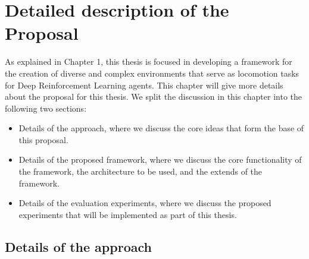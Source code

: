 
\chapter{Detailed description of the Proposal}
\label{ch:proposal}



As explained in Chapter 1, this thesis is focused  in developing a framework for 
the creation of diverse and complex environments that serve as locomotion tasks 
for Deep Reinforcement Learning agents. This chapter will give more details about the 
proposal for this thesis. We split the discussion in this chapter into the following two sections: 

\begin{itemize}
    \item Details of the approach, where we discuss the core ideas that form the base 
          of this proposal.
    \item Details of the proposed framework, where we discuss the core functionality 
          of the framework, the architecture to be used, and the extends of the framework.
    \item Details of the evaluation experiments, where we discuss the proposed experiments
          that will be implemented as part of this thesis.
\end{itemize}

\section{Details of the approach}


